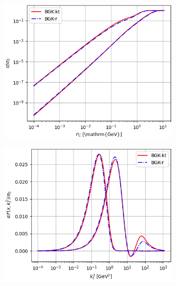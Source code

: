 \documentclass[12pt]{article}
\numberwithin{equation}{section}
\numberwithin{table}{section}
\numberwithin{figure}{section}
\begin{document}
\begin{figure}[t]
	\centering
\begin{subfigure}{0.47\textwidth}
\includegraphics[width=\textwidth]{./plots/BGK-dipole.png}
\end{subfigure}
\begin{subfigure}{0.47\textwidth}
\includegraphics[width=\textwidth]{./plots/BGK-gluon.png}
\end{subfigure}


\end{figure}
\end{document}
